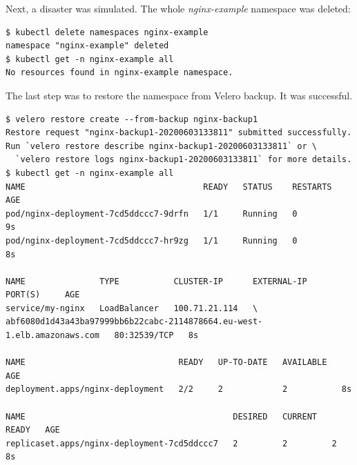 Next, a disaster was simulated. The whole \textit{nginx-example} namespace was deleted:
\begin{lstlisting}[basicstyle=\tiny,caption={Simulating a disaster to test backup}]
$ kubectl delete namespaces nginx-example
namespace "nginx-example" deleted
$ kubectl get -n nginx-example all
No resources found in nginx-example namespace.
\end{lstlisting}

The last step was to restore the namespace from Velero backup. It was successful.
\begin{lstlisting}[basicstyle=\tiny,caption={Restoring the backup}]
$ velero restore create --from-backup nginx-backup1
Restore request "nginx-backup1-20200603133811" submitted successfully.
Run `velero restore describe nginx-backup1-20200603133811` or \
  `velero restore logs nginx-backup1-20200603133811` for more details.
$ kubectl get -n nginx-example all
NAME                                    READY   STATUS    RESTARTS   AGE
pod/nginx-deployment-7cd5ddccc7-9drfn   1/1     Running   0          9s
pod/nginx-deployment-7cd5ddccc7-hr9zg   1/1     Running   0          8s

NAME               TYPE           CLUSTER-IP      EXTERNAL-IP   PORT(S)     AGE
service/my-nginx   LoadBalancer   100.71.21.114   \
abf6080d1d43a43ba97999bb6b22cabc-2114878664.eu-west-1.elb.amazonaws.com   80:32539/TCP   8s

NAME                               READY   UP-TO-DATE   AVAILABLE   AGE
deployment.apps/nginx-deployment   2/2     2            2           8s

NAME                                          DESIRED   CURRENT   READY   AGE
replicaset.apps/nginx-deployment-7cd5ddccc7   2         2         2       8s
\end{lstlisting}


